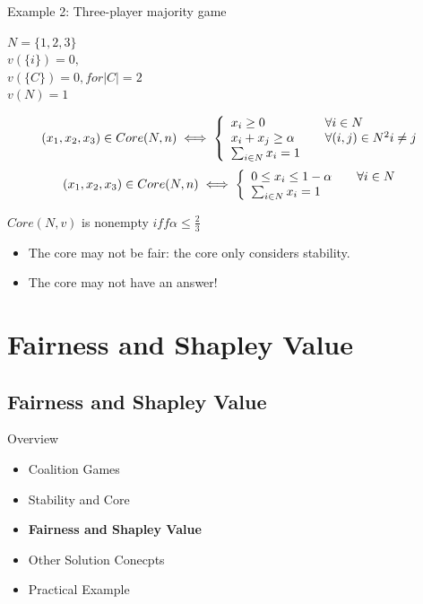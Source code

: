 \documentclass{beamer}
\begin{document}
\begin{frame} {Example 2: Three-player majority game}
    \begin{center}
      $N = \{1,2,3\}$ \\
      $v(\{i\}) = 0,$\\
      $v(\{C\}) = 0, for |C| = 2$ \\
      $v(N) = 1$ \\
    \end{center}
    \[ (x_1, x_2, x_3) \in Core(N,n) \iff \left\{
      \begin{array}{l l}
        x_i \geq 0 & \quad \forall i \in N\\
        x_i + x_j \geq \alpha & \quad \forall(i,j) \in N^2 i \neq j\\
        \sum_{i \in N} x_i = 1 &
      \end{array} \right.\]
    \[ (x_1, x_2, x_3) \in Core(N,n) \iff \left\{
      \begin{array}{l l}
        0 \leq x_i \leq 1 - \alpha & \quad \forall i \in N\\        
        \sum_{i \in N} x_i = 1 &
      \end{array} \right.\]
      
    $Core(N,v)$ is nonempty $iff \alpha \leq \frac{2}{3}$ \\

    \begin{itemize}
        \item The core may not be fair: the core only considers stability. \\
        \item The core may not have an answer!
    \end{itemize}

\end{frame}
\section{Fairness and Shapley Value}
\subsection{Fairness and Shapley Value}

\begin{frame}{Overview}
    \begin{itemize}
     	\itemsep=.5cm
    	\item Coalition Games
    	\item Stability and Core
    	\item {\bf Fairness and Shapley Value}
    	\item Other Solution Conecpts
        \item Practical Example
    \end{itemize}
\end{frame}
\end{document}
